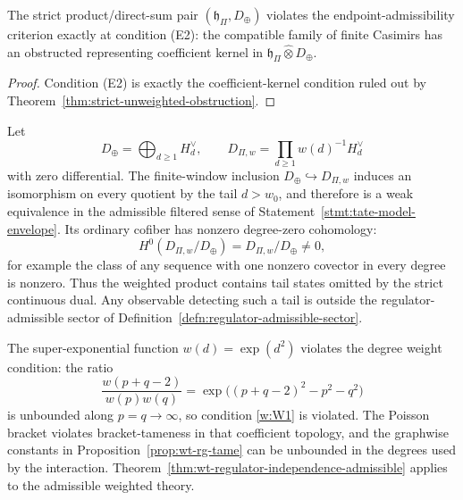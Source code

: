 \begin{cor}
\label{cor:strict-endpoint-obstruction-criterion}
	  The strict product/direct-sum pair
	  \((\mathfrak h_{\Pi},D_{\oplus})\) violates the
	  endpoint-admissibility criterion exactly at condition (E2): the
	  compatible family of finite Casimirs has an obstructed representing
	  coefficient kernel in
	  \(\mathfrak h_{\Pi}\widehat\otimes D_{\oplus}\).
\end{cor}

\begin{proof}
  Condition (E2) is exactly the coefficient-kernel condition ruled out
  by Theorem~\ref{thm:strict-unweighted-obstruction}.
\end{proof}

\begin{prop}\label{prop:weighted-completion-changes-cohomology}
  Let
  \[
    D_{\oplus}=\bigoplus_{d\geq1}H_d^\vee,\qquad
    D_{\Pi,w}=\prod_{d\geq1}w(d)^{-1}H_d^\vee
  \]
  with zero differential.  The finite-window inclusion
  \(D_{\oplus}\hookrightarrow D_{\Pi,w}\) induces an isomorphism on
  every quotient by the tail \(d>w_0\), and therefore is a weak
	  equivalence in the admissible filtered sense of
	  Statement~\ref{stmt:tate-model-envelope}.  Its ordinary cofiber has
	  nonzero degree-zero cohomology:
  \[
    H^0(D_{\Pi,w}/D_{\oplus})
      =D_{\Pi,w}/D_{\oplus}\neq0,
  \]
	  for example the class of any sequence with one nonzero covector in
	  every degree is nonzero.  Thus the weighted product contains
  tail states omitted by the strict continuous dual.  Any observable
  detecting such a tail is outside the regulator-admissible sector of
  Definition~\ref{defn:regulator-admissible-sector}.
\end{prop}

\begin{ex}\label{ex:super-exponential-bracket-obstruction}
  The super-exponential function \(w(d)=\exp(d^2)\) violates the degree
  weight condition: the ratio
  \[
    \frac{w(p+q-2)}{w(p)w(q)}
      =\exp\bigl((p+q-2)^2-p^2-q^2\bigr)
  \]
  is unbounded along \(p=q\to\infty\), so condition
  \ref{w:W1} is violated.  The Poisson bracket violates bracket-tameness
  in that coefficient topology, and the graphwise constants in
  Proposition~\ref{prop:wt-rg-tame} can be unbounded in the degrees used
  by the interaction.  Theorem~\ref{thm:wt-regulator-independence-admissible}
  applies to the admissible weighted theory.
\end{ex}
